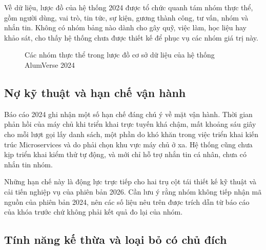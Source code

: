\documentclass[12pt,a4paper,oneside]{report}
\begin{document}
Về dữ liệu, lược đồ của hệ thống 2024 được tổ chức quanh tám nhóm thực thể, gồm người dùng, vai trò, tin tức, sự kiện, gương thành công, tư vấn, nhóm và nhắn tin. Không có nhóm bảng nào dành cho gây quỹ, việc làm, học liệu hay khảo sát, cho thấy hệ thống chưa được thiết kế để phục vụ các nhóm giá trị này.

\begin{figure}[H]\centering
{}
\caption{Các nhóm thực thể trong lược đồ cơ sở dữ liệu của hệ thống AlumVerse 2024}
\label{fig:erd2024}
\end{figure}

\subsection{Nợ kỹ thuật và hạn chế vận hành}

Báo cáo 2024 ghi nhận một số hạn chế đáng chú ý về mặt vận hành. Thời gian phản hồi của máy chủ khi triển khai trực tuyến khá chậm, mất khoảng sáu giây cho mỗi lượt gọi lấy danh sách, một phần do khó khăn trong việc triển khai kiến trúc Microservices và do phải chọn khu vực máy chủ ở xa. Hệ thống cũng chưa kịp triển khai kiểm thử tự động, và mới chỉ hỗ trợ nhắn tin cá nhân, chưa có nhắn tin nhóm.

Những hạn chế này là động lực trực tiếp cho hai trụ cột tái thiết kế kỹ thuật và cải tiến nghiệp vụ của phiên bản 2026. Cần lưu ý rằng nhóm không tiếp nhận mã nguồn của phiên bản 2024, nên các số liệu nêu trên được trích dẫn từ báo cáo của khóa trước chứ không phải kết quả đo lại của nhóm.

\subsection{Tính năng kế thừa và loại bỏ có chủ đích}
\end{document}
